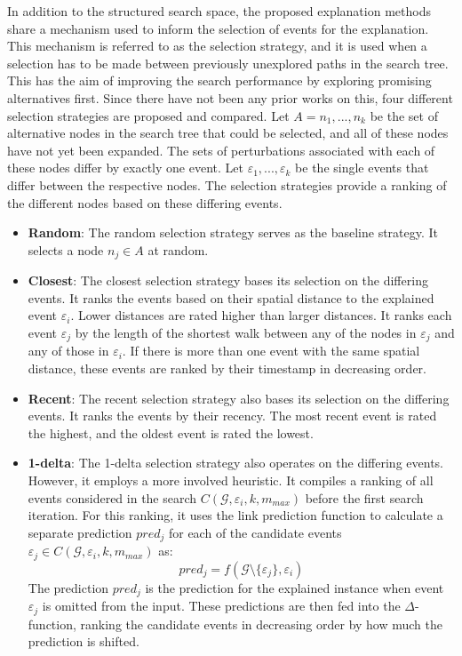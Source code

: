In addition to the structured search space, the proposed explanation methods share a mechanism used to inform the selection of events for the explanation. This mechanism is referred to as the selection strategy, and it is used when a selection has to be made between previously unexplored paths in the search tree. This has the aim of improving the search performance by exploring promising alternatives first. Since there have not been any prior works on this, four different selection strategies are proposed and compared. Let $A = {n_1,...,n_k}$ be the set of alternative nodes in the search tree that could be selected, and all of these nodes have not yet been expanded. The sets of perturbations associated with each of these nodes differ by exactly one event. Let $\varepsilon_1, ..., \varepsilon_k$ be the single events that differ between the respective nodes. The selection strategies provide a ranking of the different nodes based on these differing events.

\begin{itemize}
    \item \textbf{Random}: The random selection strategy serves as the baseline strategy. It selects a node $n_j \in A$ at random.
    \item \textbf{Closest}: The closest selection strategy bases its selection on the differing events. It ranks the events based on their spatial distance to the explained event $\varepsilon_i$. Lower distances are rated higher than larger distances. It ranks each event $\varepsilon_j$ by the length of the shortest walk between any of the nodes in $\varepsilon_j$ and any of those in $\varepsilon_i$. If there is more than one event with the same spatial distance, these events are ranked by their timestamp in decreasing order.
    \item \textbf{Recent}: The recent selection strategy also bases its selection on the differing events. It ranks the events by their recency. The most recent event is rated the highest, and the oldest event is rated the lowest.
    \item \textbf{1-delta}: The 1-delta selection strategy also operates on the differing events. However, it employs a more involved heuristic. It compiles a ranking of all events considered in the search $C(\mathcal{G}, \varepsilon_i, k, m_{max})$ before the first search iteration. For this ranking, it uses the link prediction function to calculate a separate prediction $pred_j$ for each of the candidate events $\varepsilon_j \in C(\mathcal{G}, \varepsilon_i, k, m_{max})$ as:
    \begin{equation}
        pred_j = f(\mathcal{G} \setminus \{\varepsilon_j\}, \varepsilon_i)
    \end{equation}
    The prediction $pred_j$ is the prediction for the explained instance when event $\varepsilon_j$ is omitted from the input. These predictions are then fed into the $\Delta$-function, ranking the candidate events in decreasing order by how much the prediction is shifted.
\end{itemize}

